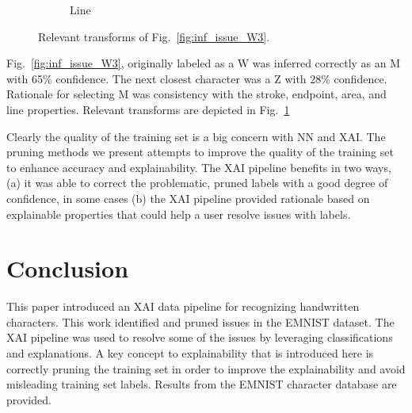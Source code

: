 \documentclass[conference]{IEEEtran}
\begin{document}
\begin{figure}[h]
\begin{subfigure}{.20\columnwidth}
        \caption{Line}
    \end{subfigure}%
    \caption{Relevant transforms of Fig.~\ref{fig:inf_issue_W3}.}
    \label{fig:w3_trans}
\end{figure}

Fig.~\ref{fig:inf_issue_W3}, originally labeled as a W was inferred correctly as an M with 65\% confidence.
The next closest character was a Z with 28\% confidence.  Rationale for selecting M was consistency with the
stroke, endpoint, area, and line properties.  Relevant transforms are depicted in Fig.~\ref{fig:w3_trans}


Clearly the quality of the training set is a big concern with NN and XAI.  The
pruning methods we present attempts to improve the quality of the training set
to enhance accuracy and explainability. The XAI pipeline benefits in two ways,
(a) it was able to correct the problematic, pruned labels with a good degree of
confidence, in some cases (b) the XAI pipeline provided rationale based on
explainable properties that could help a user resolve issues with labels.

\section{Conclusion}






This paper introduced an XAI data pipeline for recognizing handwritten
characters. This work identified and pruned issues in the EMNIST dataset.  The
XAI pipeline was used to resolve some of the issues by leveraging
classifications and explanations.  A key concept to explainability that is
introduced here is correctly pruning the training set in order to improve the
explainability and avoid misleading training set labels. Results from the EMNIST
character database are provided.



\end{document}
